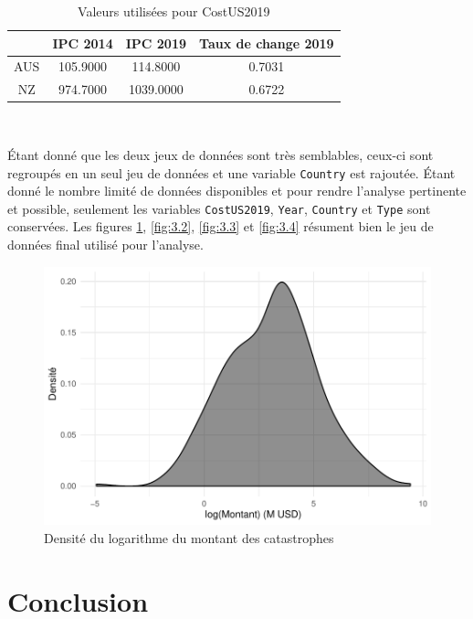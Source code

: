 \documentclass[11pt]{report}
\numberwithin{equation}{section}
\begin{document}
\begin{table}[ht]
\centering
\begin{tabular}{cccc}
  \hline
 & IPC 2014 & IPC 2019 & Taux de change 2019 \\ 
  \hline
AUS & 105.9000 & 114.8000 & 0.7031 \\ 
  NZ & 974.7000 & 1039.0000 & 0.6722 \\ 
   \hline
\end{tabular}
\caption{Valeurs utilisées pour CostUS2019} 
\label{tab:3.5}
\end{table}\

Étant donné que les deux jeux de données sont très semblables, ceux-ci sont regroupés en un seul jeu de données et une variable \texttt{Country} est rajoutée. Étant donné le nombre limité de données disponibles et pour rendre l'analyse pertinente et possible, seulement les variables \texttt{CostUS2019}, \texttt{Year}, \texttt{Country} et \texttt{Type} sont conservées. Les figures \ref{fig:3.1}, \ref{fig:3.2}, \ref{fig:3.3} et \ref{fig:3.4} résument bien le jeu de données final utilisé pour l'analyse.


\begin{figure}
\begin{center}
\includegraphics{MAIN-plot1}
\end{center}
\caption{Densité du logarithme du montant des catastrophes}
\label{fig:3.1}
\end{figure}



\chapter*{Conclusion}
\label{chap:conclusion} 




% 
\end{document}
